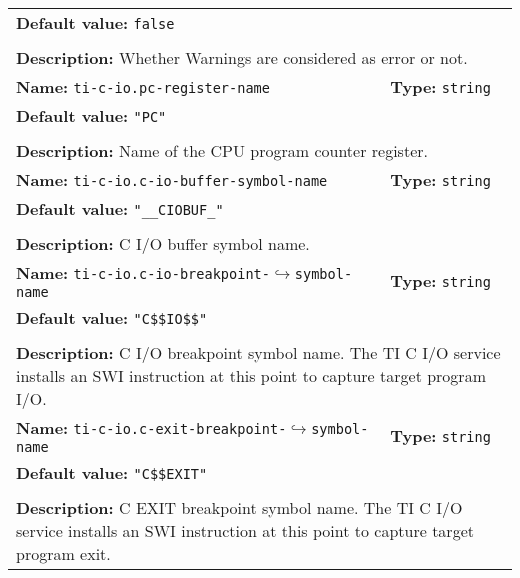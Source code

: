 \begin{center}
\begin{tabular}{|p{7.5cm}|p{7.5cm}|}
		\multicolumn{2}{|p{15cm}|}{\textbf{Default value:} \texttt{false}}\\
		\multicolumn{2}{|l|}{}\\
		\multicolumn{2}{|p{15cm}|}{\textbf{Description:} \newline Whether Warnings are considered as error or not.}\\
		\hline
		\multicolumn{1}{|p{7.5cm}}{\textbf{Name:} \texttt{ti-c-io.pc-register-name}} & \multicolumn{1}{p{7.5cm}|}{\textbf{Type:} \texttt{string}}\\
		\multicolumn{2}{|p{15cm}|}{\textbf{Default value:} \texttt{"PC"}}\\
		\multicolumn{2}{|l|}{}\\
		\multicolumn{2}{|p{15cm}|}{\textbf{Description:} \newline Name of the CPU program counter register.}\\
		\hline
		\multicolumn{1}{|p{7.5cm}}{\textbf{Name:} \texttt{ti-c-io.c-io-buffer-symbol-name}} & \multicolumn{1}{p{7.5cm}|}{\textbf{Type:} \texttt{string}}\\
		\multicolumn{2}{|p{15cm}|}{\textbf{Default value:} \texttt{"\_\_CIOBUF\_"}}\\
		\multicolumn{2}{|l|}{}\\
		\multicolumn{2}{|p{15cm}|}{\textbf{Description:} \newline C I/O buffer symbol name.}\\
		\hline
		\multicolumn{1}{|p{7.5cm}}{\textbf{Name:} \texttt{ti-c-io.c-io-breakpoint-}\newline$\hookrightarrow$\texttt{symbol-name}} & \multicolumn{1}{p{7.5cm}|}{\textbf{Type:} \texttt{string}}\\
		\multicolumn{2}{|p{15cm}|}{\textbf{Default value:} \texttt{"C\$\$IO\$\$"}}\\
		\multicolumn{2}{|l|}{}\\
		\multicolumn{2}{|p{15cm}|}{\textbf{Description:} \newline C I/O breakpoint symbol name. The TI C I/O service installs an SWI instruction at this point to capture target program I/O.}\\
		\hline
		\multicolumn{1}{|p{7.5cm}}{\textbf{Name:} \texttt{ti-c-io.c-exit-breakpoint-}\newline$\hookrightarrow$\texttt{symbol-name}} & \multicolumn{1}{p{7.5cm}|}{\textbf{Type:} \texttt{string}}\\
		\multicolumn{2}{|p{15cm}|}{\textbf{Default value:} \texttt{"C\$\$EXIT"}}\\
		\multicolumn{2}{|l|}{}\\
		\multicolumn{2}{|p{15cm}|}{\textbf{Description:} \newline C EXIT breakpoint symbol name. The TI C I/O service installs an SWI instruction at this point to capture target program exit.}\\
		\hline
	\end{tabular}
\end{center}


